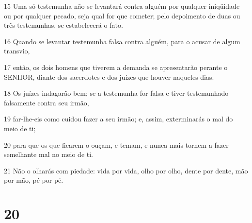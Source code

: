 \par 15 Uma só testemunha não se levantará contra alguém por qualquer iniqüidade ou por qualquer pecado, seja qual for que cometer; pelo depoimento de duas ou três testemunhas, se estabelecerá o fato.
\par 16 Quando se levantar testemunha falsa contra alguém, para o acusar de algum transvio,
\par 17 então, os dois homens que tiverem a demanda se apresentarão perante o SENHOR, diante dos sacerdotes e dos juízes que houver naqueles dias.
\par 18 Os juízes indagarão bem; se a testemunha for falsa e tiver testemunhado falsamente contra seu irmão,
\par 19 far-lhe-eis como cuidou fazer a seu irmão; e, assim, exterminarás o mal do meio de ti;
\par 20 para que os que ficarem o ouçam, e temam, e nunca mais tornem a fazer semelhante mal no meio de ti.
\par 21 Não o olharás com piedade: vida por vida, olho por olho, dente por dente, mão por mão, pé por pé.

\chapter{20}


